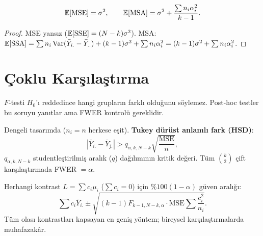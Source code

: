 \begin{teorem}\label{thm:mse_msa_beklenti}
\[
  \mathbb{E}[\mathrm{MSE}] = \sigma^2, \qquad
  \mathbb{E}[\mathrm{MSA}] = \sigma^2 + \frac{\sum n_i\alpha_i^2}{k-1}.
\]
\end{teorem}

\begin{proof}
MSE yansız ($\mathbb{E}[\mathrm{SSE}]=(N-k)\sigma^2$). MSA: $\mathbb{E}[\mathrm{SSA}]=\sum n_i\operatorname{Var}(\bar Y_{i.}-\bar Y_{..})+(k-1)\sigma^2+\sum n_i\alpha_i^2 = (k-1)\sigma^2+\sum n_i\alpha_i^2$.
\end{proof}

\section{Çoklu Karşılaştırma}
\label{sec:coklu_karsilastirma}

\begin{kesif}
$F$-testi $H_0$'ı reddedince hangi grupların farklı olduğunu söylemez. Post-hoc testler bu soruyu yanıtlar ama FWER kontrolü gereklidir.
\end{kesif}

\begin{tanim}\label{def:tukey}
Dengeli tasarımda ($n_i=n$ herkese eşit). \textbf{Tukey dürüst anlamlı fark (HSD)}:
\[
  |\bar{Y}_{i.}-\bar{Y}_{j.}| > q_{\alpha,k,N-k}\!\sqrt{\frac{\mathrm{MSE}}{n}},
\]
$q_{\alpha,k,N-k}$ studentleştirilmiş aralık ($q$) dağılımının kritik değeri. Tüm $\binom{k}{2}$ çift karşılaştırmada FWER $=\alpha$.
\end{tanim}

\begin{teorem}\label{thm:scheffe}
Herhangi kontrast $L=\sum c_i\mu_i$ ($\sum c_i=0$) için $\%100(1-\alpha)$ güven aralığı:
\[
  \sum c_i\bar{Y}_{i.} \pm \sqrt{(k-1)F_{k-1,N-k,\alpha}\cdot\mathrm{MSE}\sum\frac{c_i^2}{n_i}}.
\]
Tüm olası kontrastları kapsayan en geniş yöntem; bireysel karşılaştırmalarda muhafazakâr.
\end{teorem}

